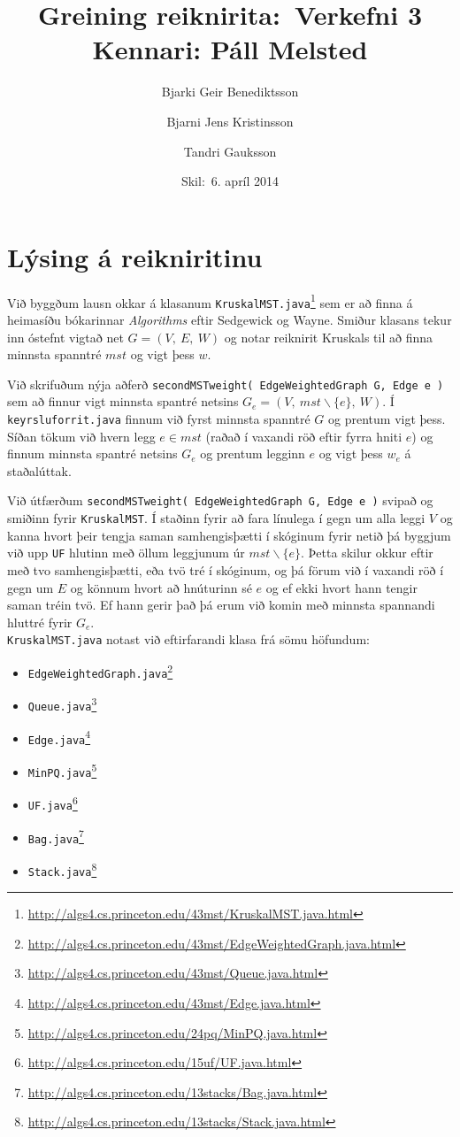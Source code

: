 \documentclass[a4paper,oneside]{article}
\title{
    Greining reiknirita:\ Verkefni 3
    \\\small{Kennari: Páll Melsted}
}
\author{Bjarki Geir Benediktsson \and  Bjarni Jens Kristinsson \and Tandri Gauksson}
\date{\small{Skil:\ 6. apríl 2014}}
\begin{document}
\maketitle

\section{Lýsing á reikniritinu}
Við byggðum lausn okkar á klasanum \texttt{KruskalMST.java}\footnote{\url{http://algs4.cs.princeton.edu/43mst/KruskalMST.java.html}} sem er að finna á heimasíðu bókarinnar \emph{Algorithms} eftir Sedgewick og Wayne. Smiður klasans tekur inn óstefnt vigtað net $G=(V, \ E, \ W)$ og notar reiknirit Kruskals til að finna minnsta spanntré $mst$ og vigt þess $w$.

Við skrifuðum nýja aðferð \texttt{secondMSTweight( EdgeWeightedGraph G, Edge e )} sem að finnur vigt minnsta spantré netsins $G_e=(V, \ mst \smallsetminus \{ e \}, \ W)$. Í \texttt{keyrsluforrit.java} finnum við fyrst minnsta spanntré $G$ og prentum vigt þess. Síðan tökum við hvern legg $e \in mst$ (raðað í vaxandi röð eftir fyrra hniti $e$) og finnum minnsta spantré netsins $G_e$ og prentum legginn $e$ og vigt þess $w_e$ á staðalúttak. 

Við útfærðum \texttt{secondMSTweight( EdgeWeightedGraph G, Edge e )} svipað og smiðinn fyrir \texttt{KruskalMST}. Í staðinn fyrir að fara línulega í gegn um alla leggi $V$ og kanna hvort þeir tengja saman samhengisþætti í skóginum fyrir netið þá byggjum við upp \texttt{UF} hlutinn með öllum leggjunum úr $mst \smallsetminus \{ e \}$. Þetta skilur okkur eftir með tvo samhengisþætti, eða tvö tré í skóginum, og þá förum við í vaxandi röð í gegn um $E$ og könnum hvort að hnúturinn sé $e$ og ef ekki hvort hann tengir saman tréin tvö. Ef hann gerir það þá erum við komin með minnsta spannandi hluttré fyrir $G_e$. \\

\noindent
\texttt{KruskalMST.java} notast við eftirfarandi klasa frá sömu höfundum:
\begin{itemize}
    \item \texttt{EdgeWeightedGraph.java}\footnote{\url{http://algs4.cs.princeton.edu/43mst/EdgeWeightedGraph.java.html}}
    \item \texttt{Queue.java}\footnote{\url{http://algs4.cs.princeton.edu/43mst/Queue.java.html}}
    \item \texttt{Edge.java}\footnote{\url{http://algs4.cs.princeton.edu/43mst/Edge.java.html}}
    \item \texttt{MinPQ.java}\footnote{\url{http://algs4.cs.princeton.edu/24pq/MinPQ.java.html}}
    \item \texttt{UF.java}\footnote{\url{http://algs4.cs.princeton.edu/15uf/UF.java.html}}
    \item \texttt{Bag.java}\footnote{\url{http://algs4.cs.princeton.edu/13stacks/Bag.java.html}}
    \item \texttt{Stack.java}\footnote{\url{http://algs4.cs.princeton.edu/13stacks/Stack.java.html}}
\end{itemize}
\end{document}
